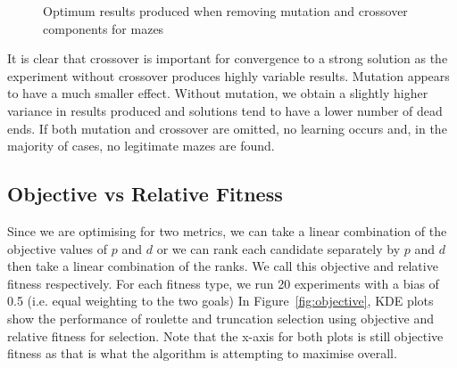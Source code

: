 \begin{figure}[!h]
\centering
            \hfill
            \hfill
            \hfill
            \caption{Optimum results produced when removing mutation and crossover components for mazes}
\label{fig:maze-ablation}
\end{figure}

It is clear that crossover is important for convergence to a strong solution as the experiment without crossover produces highly variable results. Mutation appears to have a much smaller effect. Without mutation, we obtain a slightly higher variance in results produced and solutions tend to have a lower number of dead ends. If both mutation and crossover are omitted, no learning occurs and, in the majority of cases, no legitimate mazes are found.

\subsection{Objective vs Relative Fitness}

Since we are optimising for two metrics, we can take a linear combination of the objective values of $p$ and $d$ or we can rank each candidate separately by $p$ and $d$ then take a linear combination of the ranks. We call this objective and relative fitness respectively. For each fitness type, we run 20 experiments with a bias of 0.5 (i.e. equal weighting to the two goals) In Figure~\ref{fig:objective}, KDE plots show the performance of roulette and truncation selection using objective and relative fitness for selection. Note that the x-axis for both plots is still objective fitness as that is what the algorithm is attempting to maximise overall.\\

